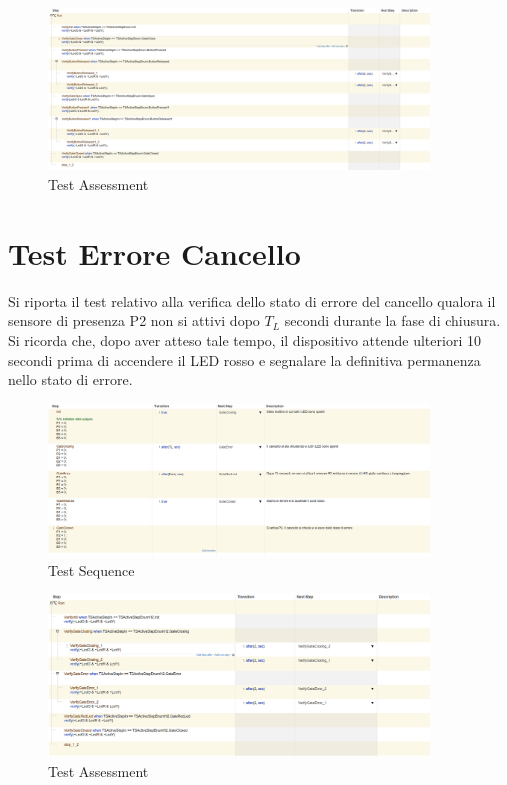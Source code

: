        \begin{figure}[H]
            \centering
            \includegraphics[width=0.9\textwidth]{figures/open_close2.png}
            \caption{Test Assessment}
            \label{openclose2}
        \end{figure}


    \section{Test Errore Cancello}
        Si riporta il test relativo alla verifica dello stato di errore del cancello qualora il sensore di presenza P2 non si attivi dopo $T_L$ secondi durante la fase di chiusura.
        Si ricorda che, dopo aver atteso tale tempo, il dispositivo attende ulteriori 10 secondi prima di accendere il LED rosso e segnalare la definitiva permanenza nello stato di errore.

        \begin{figure}[H]
            \centering
            \includegraphics[width=0.9\textwidth]{figures/error.png}
            \caption{Test Sequence}
            \label{error}
        \end{figure}
    
        \begin{figure}[H]
            \centering
            \includegraphics[width=0.9\textwidth]{figures/error2.png}
            \caption{Test Assessment}
            \label{error2}
        \end{figure}



